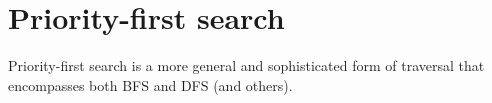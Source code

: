%
%
%
%
%

\section{Priority-first search}
\label{sec:PFS}

Priority-first search is a more general and sophisticated form of traversal that encompasses both BFS and DFS (and others). 

